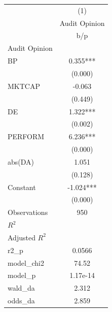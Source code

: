 {
\def\sym#1{\ifmmode^{#1}\else\(^{#1}\)\fi}
\begin{tabular}{l*{1}{c}}
\hline\hline
                    &\multicolumn{1}{c}{(1)}\\
                    &\multicolumn{1}{c}{Audit Opinion}\\
                    &         b/p   \\
\hline
Audit Opinion       &               \\
BP                  &       0.355***\\
                    &     (0.000)   \\
MKTCAP              &      -0.063   \\
                    &     (0.449)   \\
DE                  &       1.322***\\
                    &     (0.002)   \\
PERFORM             &       6.236***\\
                    &     (0.000)   \\
abs(DA)             &       1.051   \\
                    &     (0.128)   \\
Constant            &      -1.024***\\
                    &     (0.000)   \\
\hline
Observations        &         950   \\
\(R^{2}\)           &               \\
Adjusted \(R^{2}\)  &               \\
r2\_p                &      0.0566   \\
model\_chi2          &       74.52   \\
model\_p             &    1.17e-14   \\
wald\_da             &       2.312   \\
odds\_da             &       2.859   \\
\hline\hline
\end{tabular}
}

